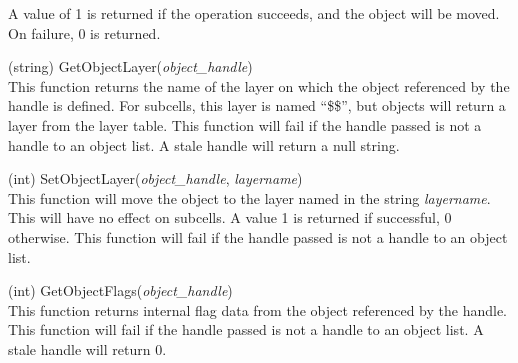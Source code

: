 \begin{description}
A value of 1 is returned if the operation succeeds, and the object
will be moved.  On failure, 0 is returned.

\item{(string) \vt GetObjectLayer({\it object\_handle\/})}\\
This function returns the name of the layer on which the object
referenced by the handle is defined.  For subcells, this layer is
named ``{\vt \$\$}'', but objects will return a layer from the layer
table.  This function will fail if the handle passed is not a handle
to an object list.  A stale handle will return a null string.

\item{(int) \vt SetObjectLayer({\it object\_handle\/}, {\it layername\/})}\\
This function will move the object to the layer named in the string
{\it layername}.  This will have no effect on subcells.  A value 1 is
returned if successful, 0 otherwise.  This function will fail if the
handle passed is not a handle to an object list.

\item{(int) \vt GetObjectFlags({\it object\_handle\/})}\\
This function returns internal flag data from the object referenced by
the handle.  This function will fail if the handle passed is not a
handle to an object list.  A stale handle will return 0.


\end{description}
